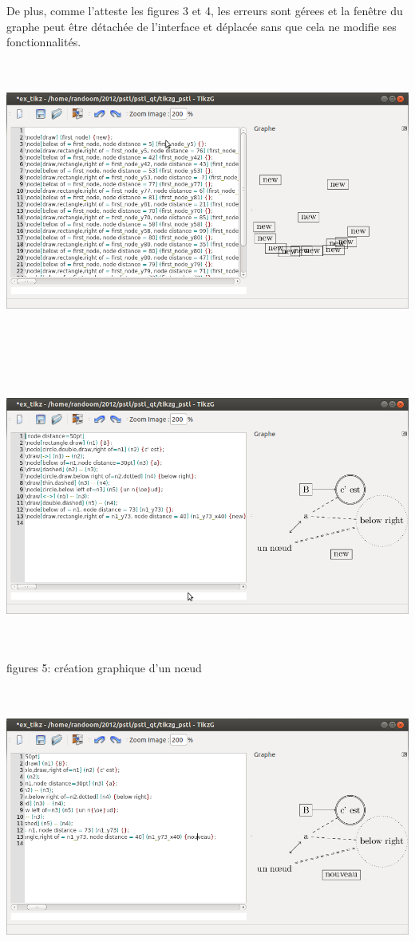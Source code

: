 \documentclass[a4paper]{report}
\begin{document}
De plus, comme l'atteste les figures 3 et 4, les erreurs sont gérees et la fenêtre du graphe peut être détachée de l'interface et déplacée sans que cela ne modifie ses fonctionnalités.
\newline
  \includegraphics[width=15cm, height=10cm]{img/r_6.png} 
\\
  \includegraphics[width=15cm, height=10cm]{img/r_3.png}
\\ 
figures 5: création graphique d'un n{\oe}ud
\newline
  \includegraphics[width=15cm, height=10cm]{img/r_5.png} 
\end{document}

